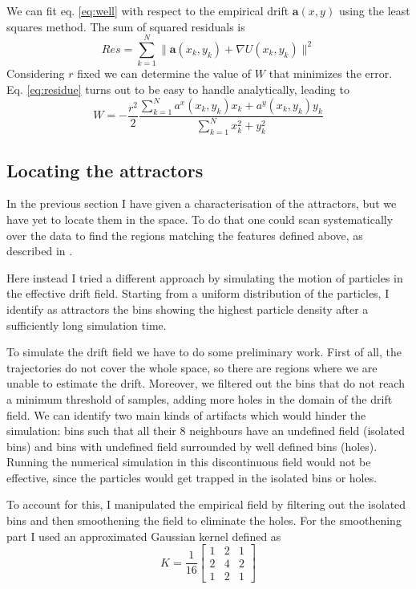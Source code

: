 \documentclass[a4paper]{article}
\begin{document}
We can fit eq. \ref{eq:well} with respect to the empirical drift $\bm{a}(x, y)$ using the least squares method. The sum of squared residuals is
\begin{equation} \label{eq:residue}
Res = \sum_{k = 1}^N \| \bm{a}(x_k, y_k) + \nabla U(x_k, y_k) \|^2
\end{equation}
Considering $r$ fixed we can determine the value of $W$ that minimizes the error. Eq. \ref{eq:residue} turns out to be easy to handle analytically, leading to
\begin{equation}
W = - \frac{r^2}{2} \frac{\sum_{k = 1}^N a^x(x_k, y_k) x_k + a^y(x_k, y_k) y_k}{\sum_{k = 1}^N x_k^2 + y_k^2}
\end{equation}

\subsection{Locating the attractors}
\label{sec:attractors}

In the previous section I have given a characterisation of the attractors, but we have yet to locate them in the space. To do that one could scan systematically over the data to find the regions matching the features defined above, as described in \cite{hoze2012}.

Here instead I tried a different approach by simulating the motion of particles in the effective drift field. Starting from a uniform distribution of the particles, I identify as attractors the bins showing the highest particle density after a sufficiently long simulation time.

To simulate the drift field we have to do some preliminary work. First of all, the trajectories do not cover the whole space, so there are regions where we are unable to estimate the drift. Moreover, we filtered out the bins that do not reach a minimum threshold of samples, adding more holes in the domain of the drift field.
We can identify two main kinds of artifacts which would hinder the simulation: bins such that all their 8 neighbours have an undefined field (isolated bins) and bins with undefined field surrounded by well defined bins (holes). Running the numerical simulation in this discontinuous field would not be effective, since the particles would get trapped in the isolated bins or holes.

To account for this, I manipulated the empirical field by filtering out the isolated bins and then smoothening the field to eliminate the holes. For the smoothening part I used an approximated Gaussian kernel defined as
\begin{equation} \label{eq:kernel}
K = \frac{1}{16} \begin{bmatrix} 1 & 2 & 1 \\ 2 & 4 & 2 \\ 1 & 2 & 1\end{bmatrix}
\end{equation}
\end{document}
